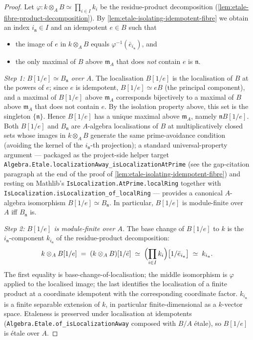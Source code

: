 \begin{proof}
\leanok
Let $\varphi : k \otimes_A B \simeq \prod_{i \in I} k_i$ be the
residue-product decomposition
(\cref{lem:etale-fibre-product-decomposition}). By
\cref{lem:etale-isolating-idempotent-fibre} we obtain an index
$i_{\mathfrak n} \in I$ and an idempotent $e \in B$ such that

\begin{itemize}
\item the image of $e$ in $k \otimes_A B$ equals
  $\varphi^{-1}(\bar e_{i_{\mathfrak n}})$, and
\item the only maximal of $B$ above $\mathfrak m_A$ that does
  \emph{not} contain $e$ is $\mathfrak n$.
\end{itemize}

\emph{Step 1: $B[1/e] \simeq B_{\mathfrak n}$ over $A$.} The
localisation $B[1/e]$ is the localisation of $B$ at the powers of
$e$; since $e$ is idempotent, $B[1/e] \simeq e B$ (the principal
component), and a maximal of $B[1/e]$ above $\mathfrak m_A$
corresponds bijectively to a maximal of $B$ above $\mathfrak m_A$
that does not contain $e$. By the isolation property
above, this set is the singleton $\{\mathfrak n\}$. Hence
$B[1/e]$ has a unique maximal above $\mathfrak m_A$, namely
$\mathfrak n B[1/e]$. Both $B[1/e]$ and $B_{\mathfrak n}$ are
$A$-algebra localisations of $B$ at multiplicatively closed sets
whose images in $k \otimes_A B$ generate the same prime-avoidance
condition (avoiding the kernel of the $i_{\mathfrak n}$-th
projection); a standard universal-property argument — packaged
as the project-side helper target
\texttt{Algebra.Etale.localizationAway\_isLocalizationAtPrime}
(see the gap-citation paragraph at the end of the proof of
\cref{lem:etale-isolating-idempotent-fibre}) and resting on
Mathlib's \texttt{IsLocalization.AtPrime.localRing} together with
\texttt{IsLocalization.isLocalization\_of\_localRing} — provides
a canonical $A$-algebra isomorphism
$B[1/e] \simeq B_{\mathfrak n}$. In
particular, $B[1/e]$ is module-finite over $A$ iff
$B_{\mathfrak n}$ is.

\emph{Step 2: $B[1/e]$ is module-finite over $A$.} The base
change of $B[1/e]$ to $k$ is the $i_{\mathfrak n}$-component
$k_{i_{\mathfrak n}}$ of the residue-product decomposition:
\[
  k \otimes_A B[1/e] \;=\; (k \otimes_A B)[1/\bar e]
   \;\simeq\; \Bigl(\prod_{i \in I} k_i\Bigr)\bigl[1/\bar e_{i_{\mathfrak n}}\bigr]
   \;\simeq\; k_{i_{\mathfrak n}}.
\]
The first equality is base-change-of-localisation; the middle
isomorphism is $\varphi$ applied to the localised image; the last
identifies the localisation of a finite product at a coordinate
idempotent with the corresponding coordinate factor.
$k_{i_{\mathfrak n}}$ is a finite separable extension of $k$, in
particular finite-dimensional as a $k$-vector space. Etaleness is
preserved under localisation at idempotents
(\texttt{Algebra.Etale.of\_isLocalizationAway} composed with
$B/A$ étale), so $B[1/e]$ is étale over $A$.


\end{proof}
